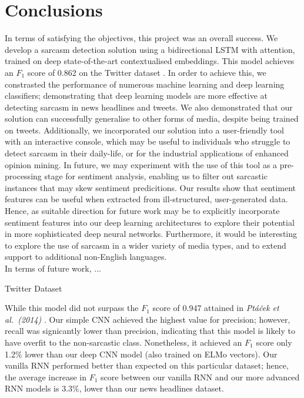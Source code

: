 \documentclass[12pt,a4paper]{article}
\begin{document}
\section{Conclusions}\vspace{-4.2pt}
\noindent In terms of satisfying the objectives, this project was an overall success. We develop a sarcasm detection solution using a bidirectional LSTM with attention, trained on deep state-of-the-art contextualised embeddings. This model achieves an $F_1$ score of 0.862 on the Twitter dataset \cite{ptavcek2014sarcasm}. In order to achieve this, we constrasted the performance of numerous machine learning and deep learning classifiers; demonstrating that deep learning models are more effective at detecting sarcasm in news headlines and tweets. We also demonstrated that our solution can successfully generalise to other forms of media, despite being trained on tweets. Additionally, we incorporated our solution into a user-friendly tool with an interactive console, which may be useful to individuals who struggle to detect sarcasm in their daily-life, or for the industrial applications of enhanced opinion mining. In future, we may experiment with the use of this tool as a pre-processing stage for sentiment analysis, enabling us to filter out sarcastic instances that may skew sentiment predicitions. Our results show that sentiment features can be useful when extracted from ill-structured, user-generated data. Hence, as suitable direction for future work may be to explicitly incorporate sentiment features into our deep learning architectures to explore their potential in more sophisticated deep neural networks. Furthermore, it would be interesting to explore the use of sarcasm in a wider variety of media types, and to extend support to additional non-English languages. \\

In terms of future work, ...


Twitter Dataset

While this model did not surpass the $F_1$ score of 0.947 attained in \textit{Pt\'a\v{c}ek et al.\ (2014)} \cite{ptavcek2014sarcasm}. 
Our simple CNN achieved the highest value for precision; however, recall was signicantly lower than precision, indicating that this model is likely to have overfit to the non-sarcastic class. Nonetheless, it achieved an $F_1$ score only 1.2\% lower than our deep CNN model (also trained on ELMo vectors). Our vanilla RNN performed better than expected on this particular dataset; hence, the average increase in $F_1$ score between our vanilla RNN and our more advanced RNN models is 3.3\%, lower than our news headlines dataset.
\end{document}
